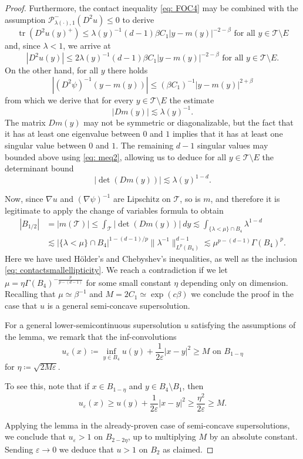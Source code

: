 \documentclass[reqno]{amsart}
\numberwithin{equation}{section}
\numberwithin{equation}{section}
\newcommand{\eps}{\varepsilon}
\newcommand{\ds}{\displaystyle}
\DeclareMathOperator{\tr}{tr}
\newcounter{case}
\begin{document}
\begin{proof}
Furthermore, the contact inequality \eqref{eq: FOC4} may be combined with the assumption $\mathcal{P}^-_{\lambda(\cdot),1}(D^2u)\le 0$ to derive
$$\tr(D^2u(y)^+) \le \lambda(y)^{-1} (d-1)\beta C_1 |y-m(y)|^{-2-\beta} \text{ for all } y \in \mathcal{T}\setminus E$$ 
and, since $\lambda <1$, we arrive at
$$|D^2u(y)| \le 2\lambda(y)^{-1} (d-1)\beta C_1 |y-m(y)|^{-2-\beta} \text{ for all } y \in \mathcal{T}\setminus E.$$
On the other hand, for all $y$ there holds
$$|(D^2\psi)^{-1}(y-m(y))| \le (\beta C_1)^{-1} |y-m(y)|^{2+\beta}$$
from which we derive that for every $y \in \mathcal{T}\setminus E$ the estimate
\begin{equation}
    \label{eq: meq2}
    |Dm(y)| \lesssim \lambda(y)^{-1}.
\end{equation}
The matrix $Dm(y)$ may not be symmetric or diagonalizable, but the fact that it has at least one eigenvalue between $0$ and $1$ implies that it has at least one singular value between $0$ and $1$. The remaining $d-1$ singular values may bounded above using \eqref{eq: meq2}, allowing us to deduce for all $y \in \mathcal{T}\setminus E$ the determinant bound
$$|\det(Dm(y))| \lesssim \lambda(y)^{1-d}.$$

Now, since $\nabla u$ and $(\nabla \psi)^{-1}$ are Lipschitz on $\mathcal{T}$, so is $m$, and therefore it is legitimate to apply the change of variables formula to obtain
\begin{align}
|B_{1/2}| &= |m(\mathcal{T})| \le \int_\mathcal{T} |\det(Dm(y))| \ dy \lesssim \int_{\{\lambda <\mu\} \cap B_4} \lambda^{1-d}\\
&\lesssim | \{\lambda <\mu\} \cap B_4|^{1-(d-1)/p} \|\lambda^{-1}\|_{L^p(B_4)}^{d-1} \lesssim \mu^{p-(d-1)}\Gamma(B_4)^{p}.
\end{align}
Here we have used H{\"o}lder's and Chebyshev's inequalities, as well as the inclusion \eqref{eq: contactsmallellipticity}. We reach a contradiction if we let $\ds \mu =\eta \Gamma(B_4)^{-\frac{p}{p-(d-1)}}$ for some small constant $\eta$ depending only on dimension. Recalling that $\mu \simeq \beta^{-1}$ and $M = 2C_1 \simeq \exp(c\beta)$ we conclude the proof in the case that $u$ is a general semi-concave supersolution. 

For a general lower-semicontinuous supersolution $u$ satisfying the assumptions of the lemma, we remark that the inf-convolutions 
$$u_\eps(x) \coloneqq \inf_{y  \in B_4} u(y) + \frac{1}{2\eps}|x-y|^2 \ge M \text{ on } B_{1-\eta}$$
for $\eta \coloneqq \sqrt{2M\eps}.$

To see this, note that if $x \in B_{1-\eta}$ and $y \in B_4 \setminus B_1$, then 
$$u_\eps(x) \ge u(y) + \frac{1}{2\eps}|x-y|^2 \ge \frac{\eta^2}{2\eps}\ge M.$$

Applying the lemma in the already-proven case of semi-concave supersolutions, we conclude that $u_\eps >1$ on $B_{2-2\eta}$, up to multiplying $M$ by an absolute constant. Sending $\eps \to 0$ we deduce that $u>1$ on $B_2$ as claimed. 
\end{proof}
\end{document}
